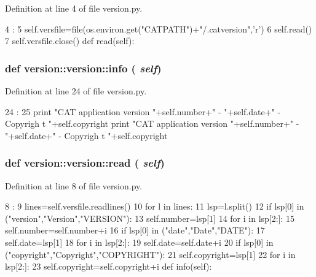 Definition at line 4 of file version.py.


\begin{DoxyCode}
4                       :
5         self.versfile=file(os.environ.get("CATPATH")+"/.catversion",'r')
6         self.read()
7         self.versfile.close()
    def read(self):
\end{DoxyCode}
\hypertarget{classversion_1_1version_a9b2a04cf6c7accb654a20c992eda01a3}{
\subsubsection[{info}]{\setlength{\rightskip}{0pt plus 5cm}def version::version::info ( {\em self})}}
\label{classversion_1_1version_a9b2a04cf6c7accb654a20c992eda01a3}


Definition at line 24 of file version.py.


\begin{DoxyCode}
24                   :
25         print "CAT application version "+self.number+" - "+self.date+" - Copyrigh
      t "+self.copyright
        print "CAT application version "+self.number+" - "+self.date+" - Copyrigh
      t "+self.copyright
\end{DoxyCode}
\hypertarget{classversion_1_1version_ac4231b167690c0cbc57a6bb9a3a12a9f}{
\subsubsection[{read}]{\setlength{\rightskip}{0pt plus 5cm}def version::version::read ( {\em self})}}
\label{classversion_1_1version_ac4231b167690c0cbc57a6bb9a3a12a9f}


Definition at line 8 of file version.py.


\begin{DoxyCode}
8                   :
9         lines=self.versfile.readlines()
10         for l in lines:
11             lsp=l.split()
12             if lsp[0] in ("version","Version","VERSION"):
13                 self.number=lsp[1]
14                 for i in lsp[2:]:
15                     self.number=self.number+i
16             if lsp[0] in ("date","Date","DATE"):
17                 self.date=lsp[1]
18                 for i in lsp[2:]:
19                     self.date=self.date+i
20             if lsp[0] in ("copyright","Copyright","COPYRIGHT"):
21                 self.copyright=lsp[1]
22                 for i in lsp[2:]:
23                     self.copyright=self.copyright+i
    def info(self):
\end{DoxyCode}


